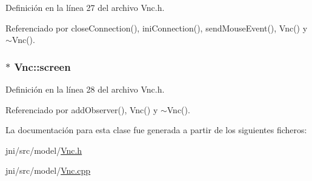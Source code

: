 Definición en la línea 27 del archivo Vnc.\-h.



Referenciado por close\-Connection(), ini\-Connection(), send\-Mouse\-Event(), Vnc() y $\sim$\-Vnc().

\hypertarget{classVnc_a88a77096922ce7dc38974bbfd62b5a2e}{
\subsubsection[{screen}]{$\ast$ Vnc\-::screen\hspace{0.3cm}{\ttfamily [private]}}}\label{classVnc_a88a77096922ce7dc38974bbfd62b5a2e}


Definición en la línea 28 del archivo Vnc.\-h.



Referenciado por add\-Observer(), Vnc() y $\sim$\-Vnc().



La documentación para esta clase fue generada a partir de los siguientes ficheros\-:\begin{DoxyCompactItemize}
\item 
jni/src/model/\hyperlink{Vnc_8h}{Vnc.\-h}\item 
jni/src/model/\hyperlink{Vnc_8cpp}{Vnc.\-cpp}\end{DoxyCompactItemize}
